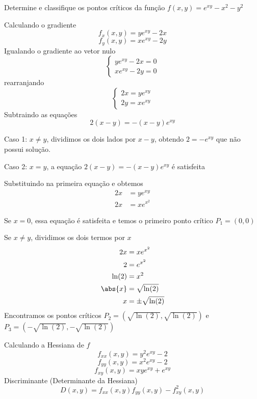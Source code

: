 \documentclass[a4paper,12pt,fleqn]{article}
\begin{document}
Determine e classifique os pontos críticos da função
\(
  f(x,y) = e^{xy} - x^2 - y^2
\)

\clearpagequestiononly

\begin{answer}
  Calculando o gradiente
  \[
    f_x(x, y)
    = y e^{xy} - 2x
  \]
  \[
    f_y(x, y)
    = x e^{xy} - 2y
  \]
  Igualando o gradiente ao vetor nulo
  \[
    \begin{cases}
      y e^{xy} - 2x = 0\\
      x e^{xy} - 2y = 0
    \end{cases}
  \]
  rearranjando
  \[
    \begin{cases}
      2x = y e^{xy} \\
      2y = x e^{xy}
    \end{cases}
  \]
  Subtraindo as equações
  \[
    2(x-y) = -(x-y)e^{xy}
  \]

  Caso 1: $x\neq y$, dividimos os dois lados por $x-y$, obtendo
  \(
    2 = -e^{xy}
  \)
  que não possui solução.

  Caso 2: $x=y$, a equação \(2(x-y) = -(x-y)e^{xy}\) é satisfeita

  Substituindo na primeira equação e obtemos
  \begin{align*}
    2x & = y e^{xy} \\
    2x & = x e^{x^2}
  \end{align*}

  Se $x=0$, essa equação é satisfeita e temos o primeiro ponto crítico \(P_1=(0, 0)\)

  Se $x\neq y$, dividimos os dois termos por $x$
  \begin{align*}
    2x      & = x e^{x^2}        \\
    2       & = e^{x^2}          \\
    \ln(2)  & = x^2              \\
    \abs{x} & = \sqrt{\ln(2)}    \\
    x       & = \pm\sqrt{\ln(2)}
  \end{align*}
  Encontramos os pontos críticos
  \(P_2 = \left( \sqrt{\ln(2)},  \sqrt{\ln(2)}\right)\) e
  \(P_3 = \left(-\sqrt{\ln(2)}, -\sqrt{\ln(2)}\right)\)

  \bigskip
  Calculando a Hessiana de $f$
  \[
    f_{xx}(x, y)
    = y^2 e^{xy}-2
  \]
  \[
    f_{yy}(x, y)
    = x^2 e^{xy}-2
  \]
  \[
    f_{xy}(x, y)
    = xy e^{xy}+e^{xy}
  \]
  Discriminante (Determinante da Hessiana)
  \[
    D(x, y) = f_{xx}(x, y)f_{yy}(x, y) - f^2_{xy}(x, y)
  \]


\end{answer}
\end{document}
